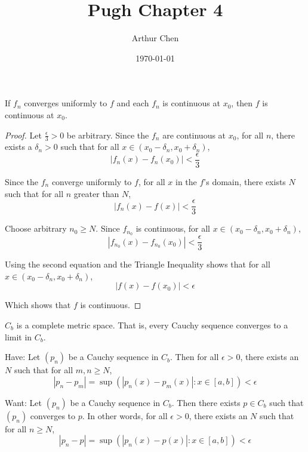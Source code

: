 \documentclass{amsart}
\author{Arthur Chen}
\title{Pugh Chapter 4}
\date{\today}
\newenvironment{manualtheorem}[1]{%
  \renewcommand\themanualtheoreminner{#1}%
  \manualtheoreminner
}{\endmanualtheoreminner}
\begin{document}
\begin{manualtheorem}{1}
If $f_n$ converges uniformly to $f$ and each $f_n$ is continuous at $x_0$, then $f$ is continuous at $x_0$.
\end{manualtheorem}

\begin{proof}
Let $\frac{\epsilon}{3} > 0$ be arbitrary. Since the $f_n$ are continuous at $x_0$, for all $n$, there exists a $\delta_n >0$ such that for all $x \in (x_0 - \delta_n, x_0 + \delta_n)$,
\[
|f_n(x) - f_n(x_0)| < \frac{\epsilon}{3}
\]

Since the $f_n$ converge uniformly to $f$, for all $x$ in the $f$'s domain, there exists $N$ such that for all $n$ greater than $N$,
\[
|f_n(x) - f(x)| < \frac{\epsilon}{3}
\]

Choose arbitrary $n_0 \geq N$. Since $f_{n_0}$ is continuous, for all $x \in (x_0 - \delta_n, x_0 + \delta_n)$,
\[
|f_{n_0}(x) - f_{n_0}(x_0)| < \frac{\epsilon}{3}
\]

Using the second equation and the Triangle Inequality shows that for all $x \in (x_0 - \delta_n, x_0 + \delta_n)$,
\[
|f(x) - f(x_0)| < \epsilon
\]

Which shows that $f$ is continuous.

\end{proof}

\begin{manualtheorem}{4}
$C_b$ is a complete metric space. That is, every Cauchy sequence converges to a limit in $C_b$.
\end{manualtheorem}

Have:
Let $(p_n)$ be a Cauchy sequence in $C_b$. Then for all $\epsilon > 0$, there exists an $N$ such that for all $m,n \geq N$,
\[
|p_n - p_m| = \sup(|p_n(x) - p_m(x)|: x \in [a, b]) < \epsilon 
\]

Want:
Let $(p_n)$ be a Cauchy sequence in $C_b$. Then there exists $p \in C_b$ such that $(p_n)$ converges to $p$. In other words, for all $\epsilon > 0$, there exists an $N$ such that for all $n \geq N$,
\[
|p_n - p| = \sup(|p_n(x) - p(x)|: x \in [a, b]) < \epsilon 
\]
\end{document}
